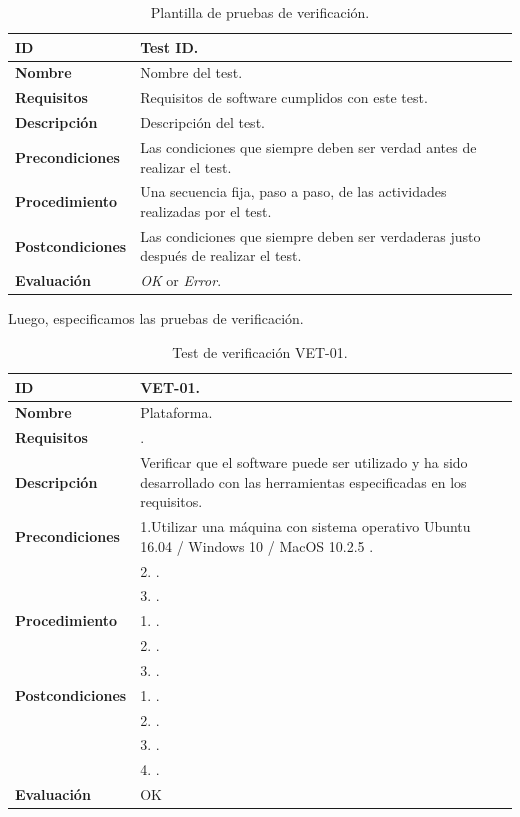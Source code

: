 \begin{center}
\begin{table}[htb]
\centering
\begin{tabular}{@{}p{2.5cm} p{9cm}@{}} 
\toprule
\textbf{ID} 					& Test ID. \\
\midrule
\textbf{Nombre} 				& Nombre del test. \\
\midrule
\textbf{Requisitos} 		& Requisitos de software cumplidos con este test. \\
\midrule
\textbf{Descripción} 		& Descripción del test. \\
\midrule
\textbf{Precondiciones}		& Las condiciones que siempre deben ser verdad antes de realizar el test. \\
\midrule
\textbf{Procedimiento}			& Una secuencia fija, paso a paso, de las actividades realizadas por el test. \\
\midrule
\textbf{Postcondiciones} 		& Las condiciones que siempre deben ser verdaderas justo después de realizar el test. \\
\midrule
\textbf{Evaluación} 			& \textit{OK} or \textit{Error}. \\
\bottomrule
\end{tabular}
\caption{Plantilla de pruebas de verificación.}
\label{tab:verification_tests}
\end{table}
\end{center}

Luego, especificamos las pruebas de verificación.

\vspace{0.7cm}

\begin{center}
\begin{table}[htb]
\centering
\begin{tabular}{@{}p{2.5cm} p{13cm}@{}} 
\toprule
\textbf{ID} 					& VET-01. \\
\midrule
\textbf{Nombre} 				& Plataforma. \\
\midrule
\textbf{Requisitos} 		& . \\
\midrule
\textbf{Descripción} 		& Verificar que el software puede ser utilizado y ha sido desarrollado con las herramientas especificadas en los requisitos. \\
\midrule
\textbf{Precondiciones}		& 1.Utilizar una máquina con sistema operativo Ubuntu 16.04 / Windows 10 / MacOS 10.2.5 .\\
							& 2. . \\
							& 3. . \\
\midrule
\textbf{Procedimiento}			& 1. . \\
							& 2. .\\
							& 3. .\\
\midrule
\textbf{Postcondiciones} 		& 1. .\\
							& 2. .\\
							& 3. . \\			
							& 4. . \\
\midrule
\textbf{Evaluación} 			& OK \\
\bottomrule
\end{tabular}
\caption{Test de verificación VET-01.}
\label{tab:vet01}
\end{table}
\end{center}


